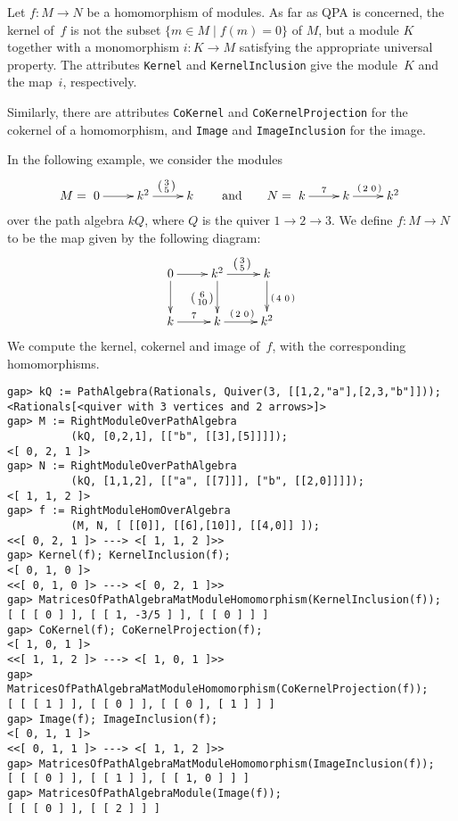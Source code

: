 \documentclass{amsart}
\theoremstyle{definition}
\newcommand{\vv}[2]{\left( \begin{smallmatrix} #1 & #2 \end{smallmatrix} \right)}
\theoremstyle{theoretic}
\begin{document}
Let $f \colon M \to N$ be a homomorphism of modules.  As far as QPA is
concerned, the kernel of~$f$ is not the subset $\{ m \in M \mid f(m) = 0
\}$ of $M$, but a module $K$ together with a monomorphism $i \colon K
\to M$ satisfying the appropriate universal property.  The attributes
\texttt{Kernel} and \texttt{KernelInclusion} give the module~$K$
and the map~$i$, respectively.

Similarly, there are attributes \texttt{CoKernel} and
\texttt{CoKernelProjection} for the cokernel of a homomorphism, and
\texttt{Image} and \texttt{ImageInclusion} for the image.

In the following example, we consider the modules
\[
M = \xymatrix{ 0 \ar[r] &
               k^2 \ar[r]^{\left( \begin{smallmatrix} 3\\5 \end{smallmatrix} \right)} &
               k }
\qquad\text{and}\qquad
N = \xymatrix{ k \ar[r]^7 &
               k \ar[r]^{\vv{2}{0}} &
               k^2 }
\]
over the path algebra $kQ$, where $Q$ is the quiver $1 \to 2 \to 3$.
We define $f \colon M \to N$ to be the map given by the following
diagram:
\[
\xymatrix{
0 \ar[r]\ar[d] &
k^2 \ar[r]^{\left( \begin{smallmatrix} 3\\5 \end{smallmatrix} \right)}
    \ar[d]_{\left( \begin{smallmatrix} 6\\10 \end{smallmatrix} \right)} &
k \ar[d]^{\vv{4}{0}}
\\
k \ar[r]^7 &
k \ar[r]^{\vv{2}{0}} &
k^2
}
\]
We compute the kernel, cokernel and image of~$f$, with the
corresponding homomorphisms.

\begin{verbatim}
gap> kQ := PathAlgebra(Rationals, Quiver(3, [[1,2,"a"],[2,3,"b"]]));
<Rationals[<quiver with 3 vertices and 2 arrows>]>
gap> M := RightModuleOverPathAlgebra
          (kQ, [0,2,1], [["b", [[3],[5]]]]);
<[ 0, 2, 1 ]>
gap> N := RightModuleOverPathAlgebra
          (kQ, [1,1,2], [["a", [[7]]], ["b", [[2,0]]]]);
<[ 1, 1, 2 ]>
gap> f := RightModuleHomOverAlgebra
          (M, N, [ [[0]], [[6],[10]], [[4,0]] ]);
<<[ 0, 2, 1 ]> ---> <[ 1, 1, 2 ]>>
gap> Kernel(f); KernelInclusion(f);
<[ 0, 1, 0 ]>
<<[ 0, 1, 0 ]> ---> <[ 0, 2, 1 ]>>
gap> MatricesOfPathAlgebraMatModuleHomomorphism(KernelInclusion(f));
[ [ [ 0 ] ], [ [ 1, -3/5 ] ], [ [ 0 ] ] ]
gap> CoKernel(f); CoKernelProjection(f);
<[ 1, 0, 1 ]>
<<[ 1, 1, 2 ]> ---> <[ 1, 0, 1 ]>>
gap> MatricesOfPathAlgebraMatModuleHomomorphism(CoKernelProjection(f));
[ [ [ 1 ] ], [ [ 0 ] ], [ [ 0 ], [ 1 ] ] ]
gap> Image(f); ImageInclusion(f);
<[ 0, 1, 1 ]>
<<[ 0, 1, 1 ]> ---> <[ 1, 1, 2 ]>>
gap> MatricesOfPathAlgebraMatModuleHomomorphism(ImageInclusion(f));
[ [ [ 0 ] ], [ [ 1 ] ], [ [ 1, 0 ] ] ]
gap> MatricesOfPathAlgebraModule(Image(f));
[ [ [ 0 ] ], [ [ 2 ] ] ]
\end{verbatim}
\end{document}
